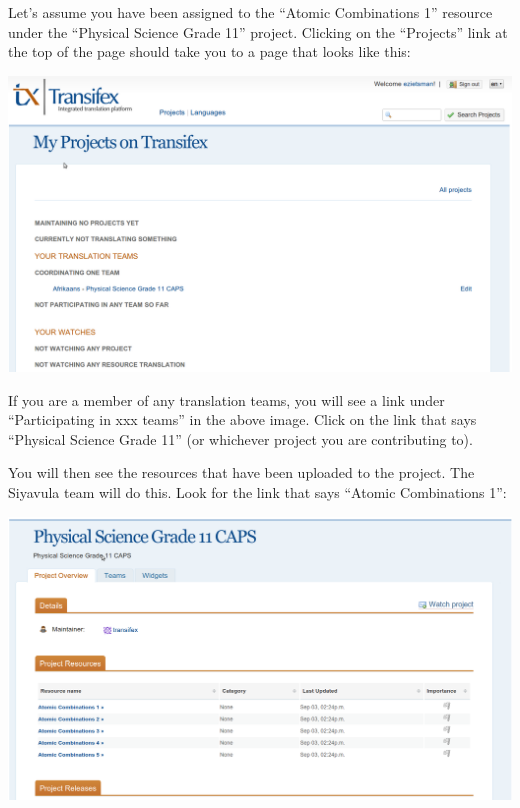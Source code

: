 \documentclass[10pt, a4paper]{article}
\begin{document}
Let's assume you have been assigned to the ``Atomic Combinations 1'' resource under the ``Physical Science Grade 11'' project. Clicking on the ``Projects'' link at the top of the page should take you to a page that looks like this:
\begin{center}
    \centerline{\includegraphics[width=\textwidth]{images/selectproject.png}}
\end{center}
If you are a member of any translation teams, you will see a link under ``Participating in xxx teams'' in the above image. Click on the link that says ``Physical Science Grade 11'' (or whichever project you are contributing to).

You will then see the resources that have been uploaded to the project. The Siyavula team will do this. Look for the link that says ``Atomic Combinations 1'':
\begin{center}
    \centerline{\includegraphics[width=\textwidth]{images/selectresource.png}}
\end{center}
\end{document}
